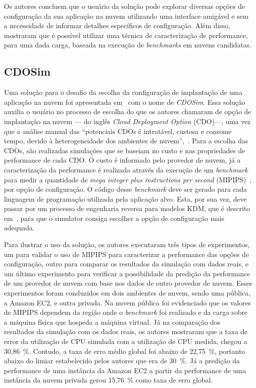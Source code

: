 Os autores concluem que o usuário da solução pode explorar diversas opções de configuração da sua aplicação na nuvem utilizando uma interface amigável e sem a necessidade de informar detalhes específicos de configuração. Além disso, mostraram que é possível utilizar uma técnica de caracterização de performance, para uma dada carga, baseada na execução de {\em benchmarks} em nuvens candidatas.

\subsection{CDOSim}\label{subsec:CDOSim}
Uma solução para o desafio da escolha da configuração de implantação de uma aplicação na nuvem foi apresentada em~\cite{fittkau2012cdosim} com o nome de \textit{CDOSim}. Essa solução auxilia o usuário no processo de escolha do que os autores chamaram de opção de implantação na nuvem --- do inglês \textit{Cloud Deployment Option} (CDO)---, uma vez que a análise manual das ``potenciais CDOs é intratável, custosa e consome tempo, devido à heterogeneidade dos ambientes de nuvem'',~\cite{fittkau2012cdosim}. Para a escolha das CDOs, são realizadas simulações que se baseiam no custo e nas propriedades de performance de cada CDO. O custo é informado pelo provedor de nuvem, já a caracterização da performance é realizada através da execução de um \textit{benchmark} para medir a quantidade de \textit{mega integer plus instructions per second} (MIPIPS)~\cite{fittkau2012cdosim}, por opção de configuração. O código desse \textit{benchmark} deve ser gerado para cada linguagem de programação utilizada pela aplicação alvo. Esta, por sua vez, deve passar por um processo de engenharia reversa para modelos KDM, que é descrito em~\cite{perez2011knowledge}, para que o simulator consiga escolher a opção de configuração mais adequada.

Para ilustrar o uso da solução, os autores executaram três tipos de experimentos, um para validar o uso de MIPIPS para caracterizar a performance das opções de configuração, outro para comparar os resultados da simulação com dados reais, e um último experimento para verificar a possibilidade da predição da performance de um provedor de nuvem com base nos dados de outro provedor de nuvem. Esses experimentos foram conduzidos em dois ambientes de nuvem, sendo uma pública, a Amazon EC2, e outra privada. Na nuvem pública foi evidenciado que os valores de MIPIPS dependem da região onde o \textit{benchmark} foi realizado e da carga sobre a máquina física que hospeda a máquina virtual. Já na comparação dos resultados da simulação com os dados reais, os autores mostraram que a taxa de error da utilização de CPU simulada com a utilização de CPU medida, chegou a 30,86~\%. Contudo, a taxa de erro médio global foi abaixo de 22,75~\%, portanto abaixo do limiar estabelecido pelos autores que era de 30~\%. Já a predição da performance de uma instância da Amazon EC2 a partir da performance de uma instância da nuvem privada gerou 15,76~\% como taxa de erro global.

